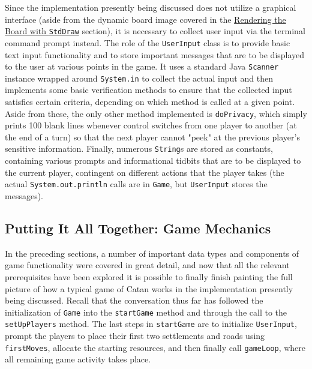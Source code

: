 \documentclass[pageno]{jpaper}
\begin{document}
\begin{doublespacing}
Since the implementation presently being discussed does not utilize a graphical interface (aside from the dynamic board image covered in the \hyperlink{sec:rendering_the_board_with_stddraw}{Rendering the Board with \lstinline$StdDraw$} section), it is necessary to collect user input via the terminal command prompt instead. The role of the \lstinline$UserInput$ class is to provide basic text input functionality and to store important messages that are to be displayed to the user at various points in the game. It uses a standard Java \lstinline$Scanner$ instance wrapped around \lstinline$System.in$ to collect the actual input and then implements some basic verification methods to ensure that the collected input satisfies certain criteria, depending on which method is called at a given point. Aside from these, the only other method implemented is \lstinline$doPrivacy$, which simply prints 100 blank lines whenever control switches from one player to another (at the end of a turn) so that the next player cannot "peek" at the previous player's sensitive information. Finally, numerous \lstinline$String$s are stored as constants, containing various prompts and informational tidbits that are to be displayed to the current player, contingent on different actions that the player takes (the actual \lstinline$System.out.println$ calls are in \lstinline$Game$, but \lstinline$UserInput$ stores the messages).

\hypertarget{sec:putting_it_all_together_game_mechanics}{}
\subsection{Putting It All Together: Game Mechanics}

In the preceding sections, a number of important data types and components of game functionality were covered in great detail, and now that all the relevant prerequisites have been explored it is possible to finally finish painting the full picture of how a typical game of Catan works in the implementation presently being discussed. Recall that the conversation thus far has followed the initialization of \lstinline$Game$ into the \lstinline$startGame$ method and through the call to the \lstinline$setUpPlayers$ method. The last steps in \lstinline$startGame$ are to initialize \lstinline$UserInput$, prompt the players to place their first two settlements and roads using \lstinline$firstMoves$, allocate the starting resources, and then finally call \lstinline$gameLoop$, where all remaining game activity takes place.


\end{doublespacing}
\end{document}
